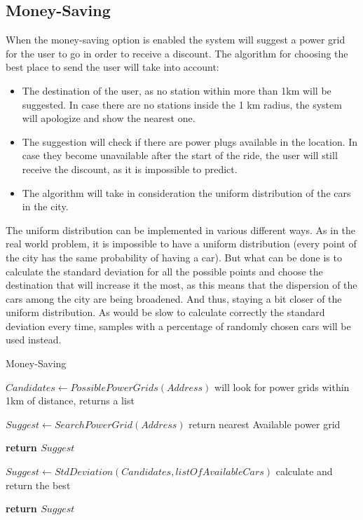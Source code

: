 \documentclass[a4paper]{article}
\begin{document}
\subsection{Money-Saving}
When the money-saving option is enabled the system will suggest a power grid for the user to go in order to receive a discount. The algorithm for choosing the best place to send the user will take into account:
\begin{itemize} 
\item  The destination of the user, as no station within more than 1km will be suggested. In case there are no stations inside the 1 km radius, the system will apologize and show the nearest one. 
\item The suggestion will check if there are power plugs available in the location. In case they become unavailable after the start of the ride, the user will still receive the discount, as it is impossible to predict.
\item The algorithm will take in consideration the uniform distribution of the cars in the city.
\end{itemize}
The uniform distribution can be implemented in various different ways. As in the real world problem, it is impossible to have a uniform distribution (every point of the city has the same probability of having a car). But what can be done is to calculate the standard deviation for all the possible points and choose the destination that will increase it the most, as this means that the dispersion of the cars among the city are being broadened. And thus, staying a bit closer of the uniform distribution. \newline
As would be slow to calculate correctly the standard deviation every time, samples with a percentage of randomly chosen cars will be used instead.

\begin{algorithm}[H]
\caption{Money-Saving}\label{Money}
\begin{algorithmic}[1]

\State $Candidates \leftarrow PossiblePowerGrids(Address)$ \Comment will look for power grids within 1km of distance, returns a list

	\State $Suggest \leftarrow SearchPowerGrid(Address)$ \Comment return nearest Available power grid
	
	\State \textbf{return $Suggest$}

\Else 
	\State $Suggest \leftarrow StdDeviation(Candidates, listOfAvailableCars)$ \Comment calculate and return the best
\EndIf

\State \textbf{return $Suggest$}
\EndProcedure
\end{algorithmic}
\end{algorithm}
\end{document}
